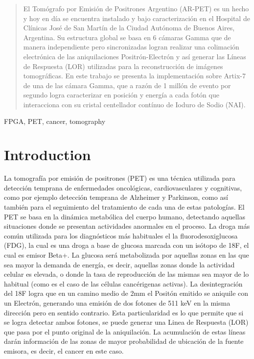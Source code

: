 \documentclass[conference]{IEEEtran}
\begin{document}
\begin{abstract}
El Tomógrafo por Emisión de Positrones Argentino (AR-PET) es un hecho y hoy en día se encuentra instalado y bajo caracterización en el Hospital de Clínicas José de San Martín de la Ciudad Autónoma de Buenos Aires, Argentina. Su estructura global se basa en 6 cámaras Gamma que de manera independiente pero sincronizadas logran realizar una colimación electrónica de las aniquilaciones Positrón-Electrón y así generar las Líneas de Respuesta (LOR) utilizadas para la reconstrucción de imágenes tomográficas. En este trabajo se presenta la implementación sobre Artix-7 de una de las cámara Gamma, que a razón de 1 millón de evento por segundo logra caracterizar en posición y energía a cada fotón que interacciona con su cristal centellador contínuo de Ioduro de Sodio (NAI).
\end{abstract}

\begin{IEEEkeywords}
FPGA, PET, cancer, tomography
\end{IEEEkeywords}

\section{Introduction}
La tomografía por emisión de positrones (PET) es una técnica utilizada para detección temprana de enfermedades oncológicas, cardiovasculares y cognitivas, como por ejemplo detección temprana de Alzheimer y Parkinson, como así también para el seguimiento del tratamiento de cada una de estas patologías. El PET se basa en la dinámica metabólica del cuerpo humano, detectando aquellas situaciones donde se presentan actividades anormales en el proceso.
La droga más común utilizada para los diagnósticos más habituales el la fluorodesoxiglucosa (FDG), la cual es una droga a base de glucosa marcada con un isótopo de 18F, el cual es emisor Beta+. La glucosa será metabolizada por aquellas zonas en las que sea mayor la demanda de energía, es decir, aquellas zonas donde la actividad celular es elevada, o donde la tasa de reproducción de las mismas sea mayor de lo habitual (como es el caso de las células cancérigenas activas). 
La desintegración del 18F logra que en un camino medio de 2mm el Positón emitido se aniquile con un Electrón, generando una emisión de dos fotones de 511 keV en la misma dirección pero en sentido contrario. Esta particularidad es lo que permite que si se logra detectar ambos fotones, se puede generar una Linea de Respuesta (LOR) que pasa por el punto original de la aniquilación. La acumulación de estas líneas darán información de las zonas de mayor probabilidad de ubicación de la fuente emisora, es decir, el cancer en este caso.
\end{document}
